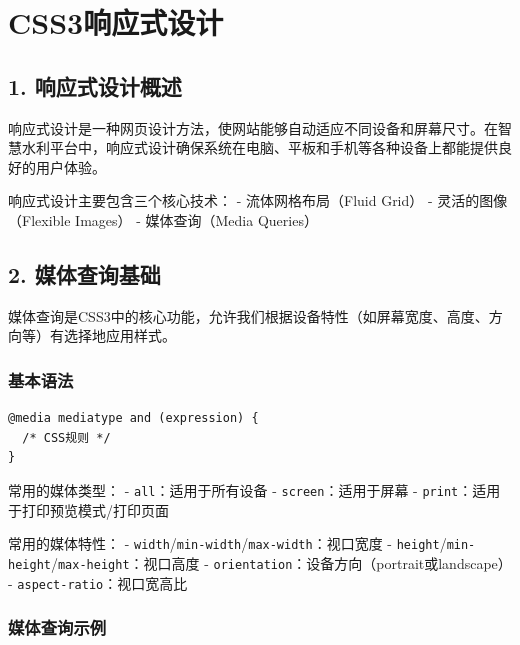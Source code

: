 \section{CSS3响应式设计}\label{css3ux54cdux5e94ux5f0fux8bbeux8ba1}

\subsection{1.
响应式设计概述}\label{ux54cdux5e94ux5f0fux8bbeux8ba1ux6982ux8ff0}

响应式设计是一种网页设计方法，使网站能够自动适应不同设备和屏幕尺寸。在智慧水利平台中，响应式设计确保系统在电脑、平板和手机等各种设备上都能提供良好的用户体验。

响应式设计主要包含三个核心技术： - 流体网格布局（Fluid Grid） -
灵活的图像（Flexible Images） - 媒体查询（Media Queries）

\subsection{2. 媒体查询基础}\label{ux5a92ux4f53ux67e5ux8be2ux57faux7840}

媒体查询是CSS3中的核心功能，允许我们根据设备特性（如屏幕宽度、高度、方向等）有选择地应用样式。

\subsubsection{基本语法}\label{ux57faux672cux8bedux6cd5}

\begin{lstlisting}
@media mediatype and (expression) {
  /* CSS规则 */
}
\end{lstlisting}

常用的媒体类型： - \passthrough{\lstinline!all!}：适用于所有设备 -
\passthrough{\lstinline!screen!}：适用于屏幕 -
\passthrough{\lstinline!print!}：适用于打印预览模式/打印页面

常用的媒体特性： -
\passthrough{\lstinline!width!}/\passthrough{\lstinline!min-width!}/\passthrough{\lstinline!max-width!}：视口宽度
-
\passthrough{\lstinline!height!}/\passthrough{\lstinline!min-height!}/\passthrough{\lstinline!max-height!}：视口高度
- \passthrough{\lstinline!orientation!}：设备方向（portrait或landscape）
- \passthrough{\lstinline!aspect-ratio!}：视口宽高比

\subsubsection{媒体查询示例}\label{ux5a92ux4f53ux67e5ux8be2ux793aux4f8b}

